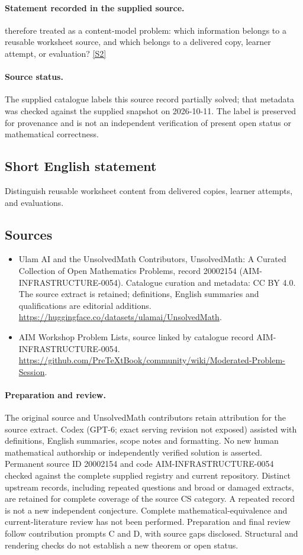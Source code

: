 \documentclass[11pt]{article}
\newcommand{\sref}[2]{\hyperlink{source:#1:#2}{[S#2]}}
\begin{document}
\paragraph{Statement recorded in the supplied source.}
therefore treated as a content-model problem: which information belongs to a
reusable worksheet source, and which belongs to a delivered copy, learner
attempt, or evaluation? \sref{20002154}{2}
\paragraph{Source status.}
The supplied catalogue labels this source record partially solved; that metadata was checked against the supplied snapshot on 2026-10-11. The label is preserved for provenance and is not an independent verification of present open status or mathematical correctness.
\subsection{Short English statement}
Distinguish reusable worksheet content from delivered copies, learner attempts, and evaluations.
\subsection{Sources}
\begin{itemize}
\item[\hypertarget{source:20002154:1}{S1}] Ulam AI and the UnsolvedMath Contributors, UnsolvedMath: A Curated Collection of Open Mathematics Problems, record 20002154 (AIM-INFRASTRUCTURE-0054). Catalogue curation and metadata: CC BY 4.0. The source extract is retained; definitions, English summaries and qualifications are editorial additions.
\url{https://huggingface.co/datasets/ulamai/UnsolvedMath}.
\item[\hypertarget{source:20002154:2}{S2}] AIM Workshop Problem Lists, source linked by catalogue record AIM-INFRASTRUCTURE-0054.
\url{https://github.com/PreTeXtBook/community/wiki/Moderated-Problem-Session}.
\end{itemize}
\paragraph{Preparation and review.}
The original source and UnsolvedMath contributors retain attribution for the source extract. Codex (GPT-6; exact serving revision not exposed) assisted with definitions, English summaries, scope notes and formatting. No new human mathematical authorship or independently verified solution is asserted. Permanent source ID 20002154 and code AIM-INFRASTRUCTURE-0054 checked against the complete supplied registry and current repository. Distinct upstream records, including repeated questions and broad or damaged extracts, are retained for complete coverage of the source CS category. A repeated record is not a new independent conjecture. Complete mathematical-equivalence and current-literature review has not been performed. Preparation and final review follow contribution prompts C and D, with source gaps disclosed. Structural and rendering checks do not establish a new theorem or open status.
\label{end:20002154}
\end{document}
